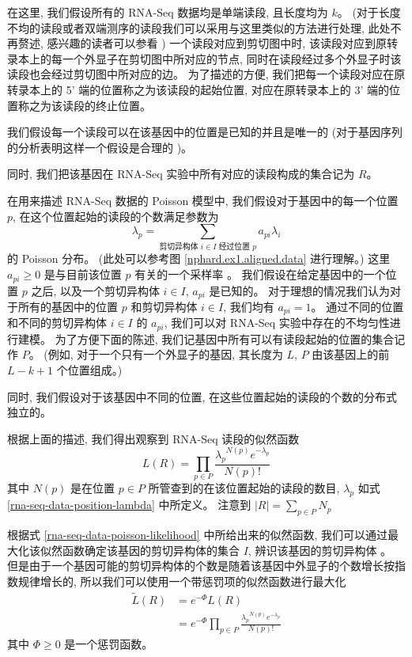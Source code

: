 在这里, 我们假设所有的 RNA-Seq 数据均是单端读段, 且长度均为 $k$。 
(对于长度不均的读段或者双端测序的读段我们可以采用与这里类似的方法进行处理, 
此处不再赘述, 感兴趣的读者可以参看 ) 
一个读段对应到剪切图中时, 该读段对应到原转录本上的每一个外显子在剪切图中所对应的节点, 
同时在读段经过多个外显子时该读段也会经过剪切图中所对应的边。 
为了描述的方便, 我们把每一个读段对应在原转录本上的 5' 端的位置称之为该读段的起始位置, 
对应在原转录本上的 3' 端的位置称之为该读段的终止位置。 

我们假设每一个读段可以在该基因中的位置是已知的并且是唯一的 
(对于基因序列的分析表明这样一个假设是合理的 \cite{peng2011t})。 

同时, 我们把该基因在 RNA-Seq 实验中所有对应的读段构成的集合记为 $R$。 

在用来描述 RNA-Seq 数据的 Poisson 模型中, 
我们假设对于基因中的每一个位置 $p$, 
在这个位置起始的读段的个数满足参数为 
\begin{equation}
\label{rna-seq-data-position-lambda}
\lambda_p = \sum_{\text{剪切异构体 $i \in I$ 经过位置 $p$}} a_{pi} \lambda_i
\end{equation}
的 Poisson 分布。 (此处可以参考图 \ref{nphard.ex1.aligned.data} 进行理解。)
这里 $a_{pi} \geq 0$ 是与目前该位置 $p$ 有关的一个采样率 \cite{2011arXiv1106.3211S}。 
我们假设在给定基因中的一个位置 $p$ 之后, 以及一个剪切异构体 $i \in I$, 
$a_{pi}$ 是已知的。 
对于理想的情况我们认为对于所有的基因中的位置 $p$ 和剪切异构体 $i\in I$, 
我们均有 $a_{pi}=1$。 
通过不同的位置和不同的剪切异构体 $i\in I$ 的 $a_{pi}$, 
我们可以对 RNA-Seq 实验中存在的不均匀性进行建模。 
为了方便下面的陈述, 我们记基因中所有可以有读段起始的位置的集合记作 $P$。 
(例如, 对于一个只有一个外显子的基因, 其长度为 $L$, 
$P$ 由该基因上的前 $L-k+1$ 个位置组成。)

同时, 我们假设对于该基因中不同的位置, 
在这些位置起始的读段的个数的分布式独立的。 

根据上面的描述, 我们得出观察到 RNA-Seq 读段的似然函数
\begin{equation}
\label{rna-seq-data-poisson-likelihood}
L(R)= \prod_{p\in P} \frac{{\lambda_p}^{N(p)} e^{-\lambda_p}}{N(p)!}
\end{equation}
其中 $N(p)$ 是在位置 $p\in P$ 所管查到的在该位置起始的读段的数目, 
$\lambda_p$ 如式 \eqref{rna-seq-data-position-lambda} 中所定义。 
注意到 $|R|=\sum_{p\in P}N_p$

根据式 \eqref{rna-seq-data-poisson-likelihood} 中所给出来的似然函数, 
我们可以通过最大化该似然函数确定该基因的剪切异构体的集合 $I$, 
辨识该基因的剪切异构体 \cite{xing2006expectation}。 
但是由于一个基因可能的剪切异构体的个数是随着该基因中外显子的个数增长按指数规律增长的, 
所以我们可以使用一个带惩罚项的似然函数进行最大化
\begin{align}
\tilde{L}(R) &= e^{-\Phi} L(R) \nonumber \\ 
\label{rna-seq-data-poisson-penalized-likelihood}
&= e^{-\Phi} \prod_{p\in P} \frac{{\lambda_p}^{N(p)} e^{-\lambda_p}}{N(p)!}
\end{align}
其中 $\Phi \geq 0$ 是一个惩罚函数。 

